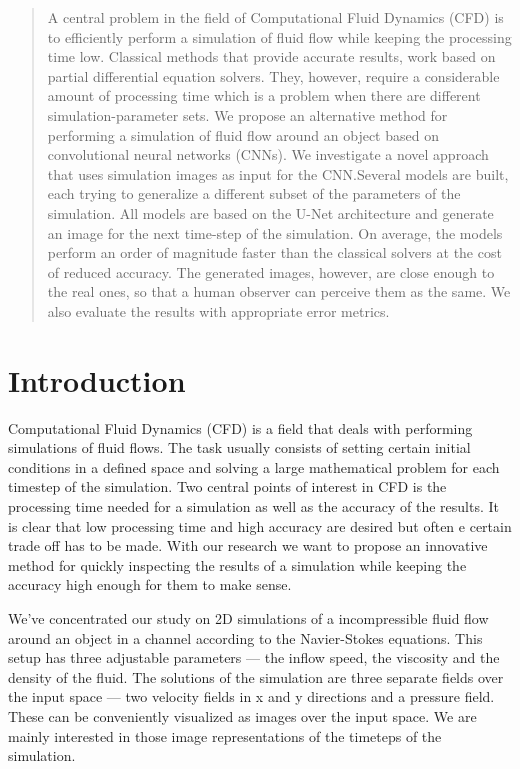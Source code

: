 \documentclass{llncs}
\begin{document}
\begin{abstract}
A central problem in the field of Computational Fluid Dynamics (CFD) is to efficiently perform a simulation of fluid flow while keeping the processing time low. Classical methods that provide accurate results, work based on partial differential equation solvers. They, however, require a considerable amount of processing time which is a problem when there are different simulation-parameter sets. We propose an alternative method for performing a simulation of fluid flow around an object based on convolutional neural networks (CNNs). We investigate a novel approach that uses simulation images as input for the CNN.\@ Several models are built, each trying to generalize a different subset of the parameters of the simulation. All models are based on the U-Net architecture and generate an image for the next time-step of the simulation. On average, the models perform an order of magnitude faster than the classical solvers at the cost of reduced accuracy. The generated images, however, are close enough to the real ones, so that a human observer can perceive them as the same. We also evaluate the results with appropriate error metrics.
\end{abstract}


\section{Introduction}\label{introduction}
Computational Fluid Dynamics (CFD) is a field that deals with performing simulations of fluid flows. The task usually consists of setting certain initial conditions in a defined space and solving a large mathematical problem for each timestep of the simulation. Two central points of interest in CFD is the processing time needed for a simulation as well as the accuracy of the results. It is clear that low processing time and high accuracy are desired but often e certain trade off has to be made. With our research we want to propose an innovative method for quickly inspecting the results of a simulation while keeping the accuracy high enough for them to make sense.

We've concentrated our study on 2D simulations of a incompressible fluid flow around an object in a channel according to the Navier-Stokes equations. This setup has three adjustable parameters --- the inflow speed, the viscosity and the density of the fluid. The solutions of the simulation are three separate fields over the input space --- two velocity fields in x and y directions and a pressure field. These can be conveniently visualized as images over the input space. We are mainly interested in those image representations of the timeteps of the simulation.
\end{document}
